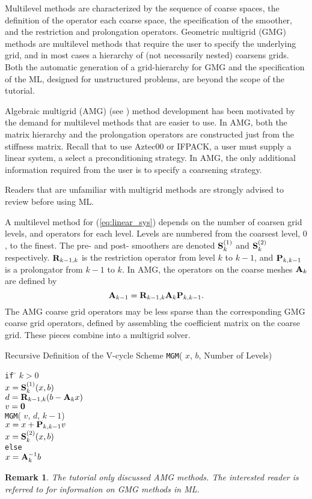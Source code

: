 \documentclass[10pt,relax]{SANDreport}
\newtheorem{remark}{Remark}
\begin{document}
Multilevel methods are characterized by
the sequence of coarse spaces,
the definition of the operator each coarse space,
the specification of the smoother, and the
restriction and prolongation operators.
Geometric multigrid (GMG) methods  are multilevel methods
that require the user to specify the underlying grid, and
in most cases a hierarchy of (not necessarily nested) coarsens grids.
Both the automatic generation of a grid-hierarchy for GMG and the
specification of the ML, designed for unstructured problems,
are beyond the scope of the tutorial.

Algebraic multigrid (AMG)  (see \cite[Section 8]{Briggs2000})
method development has been motivated by the demand for multilevel
methods that are easier to use.
In AMG, both the matrix hierarchy and the prolongation operators are
constructed just from the stiffness matrix.
Recall that to use Aztec00 or IFPACK,  a user must
supply a linear system, a select a preconditioning strategy.
In AMG, the only additional information required
from the user is to specify a coarsening strategy.

Readers that are unfamiliar with multigrid methods are strongly advised to
review \cite{Briggs2000} before using ML.

A multilevel method for (\ref{eq:linear_sys})
depends on the number of coarsen grid levels,
and operators for each level.
Levels are numbered from the coarsest level, $0$, to the finest.
The pre- and post- smoothers  are denoted
${\bf S}_k^{(1)}$ and ${\bf S}_k^{(2)}$ respectively.
${\bf R}_{k-1,k}$
is the restriction operator from level $k$ to $k-1$, and ${\bf P}_{k,k-1}$ is a
prolongator from $k-1$ to $k$.
In AMG, the operators on the coarse meshes ${\bf A}_k$ are defined by
\[
{\bf A}_{k-1} = {\bf R}_{k-1,k} {\bf A}_k {\bf P}_{k,k-1}.
\]
The AMG coarse grid operators may be less sparse than the corresponding GMG coarse grid operators,
defined by assembling the coefficient matrix on the coarse grid.
These pieces combine into a multigrid solver.
\begin{center}
  Recursive Definition of the V-cycle Scheme {\tt MGM}( $x$, $b$, Number
  of Levels)
\end{center}
\begin{tabbing}
{\tt if} \= $k>0$ \\
\> $x = {\bf S}_k^{(1)} (x, b)$ \\
\> $d = {\bf R}_{k-1,k}(b - {\bf A}_k x)$\\
\> $v = {\bf 0}$ \\
\> {\tt MGM}( $v$, $d$, $k-1$) \\
\> $x = x + {\bf P}_{k,k-1} v $\\
\> $x = {\bf S}_k^{(2)}( x, b )$\\
{\tt else} \\
\> $x = {\bf A}_k^{-1} b $\\
\end{tabbing}
\begin{remark}
The tutorial only discussed AMG methods.
The interested reader is referred to
\cite{ML-home-page} for information on GMG methods
in ML.
\end{remark}
\end{document}
